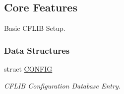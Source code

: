 \hypertarget{group__cflib__core}{\subsection{Core Features}
\label{group__cflib__core}
}


Basic C\-F\-L\-I\-B Setup.  


\subsubsection*{Data Structures}
\begin{DoxyCompactItemize}
\item 
struct \hyperlink{struct_c_o_n_f_i_g}{C\-O\-N\-F\-I\-G}
\begin{DoxyCompactList}\small\item\em C\-F\-L\-I\-B Configuration Database Entry. \end{DoxyCompactList}\end{DoxyCompactItemize}
